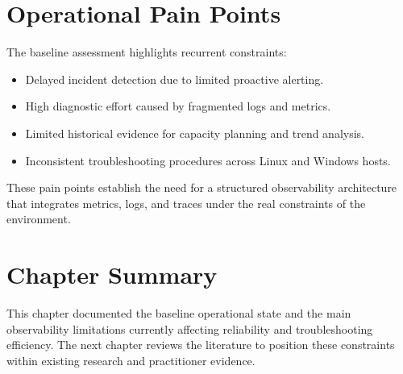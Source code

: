 \section{Operational Pain Points}

The baseline assessment highlights recurrent constraints:
\begin{itemize}
    \item Delayed incident detection due to limited proactive alerting.
    \item High diagnostic effort caused by fragmented logs and metrics.
    \item Limited historical evidence for capacity planning and trend analysis.
    \item Inconsistent troubleshooting procedures across Linux and Windows hosts.
\end{itemize}

These pain points establish the need for a structured observability architecture that integrates metrics, logs, and traces under the real constraints of the environment.

\section{Chapter Summary}

This chapter documented the baseline operational state and the main observability limitations currently affecting reliability and troubleshooting efficiency. The next chapter reviews the literature to position these constraints within existing research and practitioner evidence.
